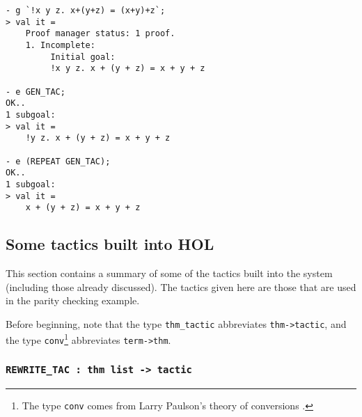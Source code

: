 \begin{session}\begin{verbatim}
- g `!x y z. x+(y+z) = (x+y)+z`;
> val it =
    Proof manager status: 1 proof.
    1. Incomplete:
         Initial goal:
         !x y z. x + (y + z) = x + y + z

- e GEN_TAC;
OK..
1 subgoal:
> val it =
    !y z. x + (y + z) = x + y + z

- e (REPEAT GEN_TAC);
OK..
1 subgoal:
> val it =
    x + (y + z) = x + y + z
\end{verbatim}\end{session}

\subsection{Some tactics built into HOL}

This section contains a summary of some of the tactics built into the
\HOL{} system (including those already discussed).  The tactics given
here are those that are used in the parity checking example.

Before beginning, note that the \ML{} type {\small\verb|thm_tactic|}
abbreviates {\small\verb|thm->tactic|}, and the type
{\small\verb|conv|}\footnote{The type {\small{\tt conv}} comes from
Larry Paulson's theory of conversions \cite{lcp_rewrite}.}
abbreviates {\small\verb|term->thm|}.

\subsubsection{\tt REWRITE\_TAC : thm list -> tactic}
\label{rewrite}

